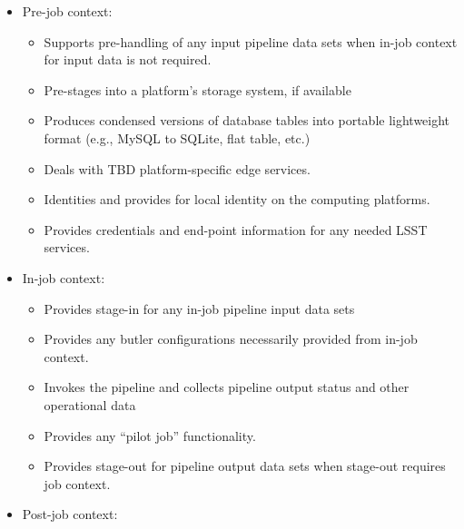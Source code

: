 \begin{itemize}

\item Pre-job context:

    \begin{itemize}

    \item Supports pre-handling of any input pipeline data sets when in-job
    context for input data is not required.

    \item Pre-stages into a platform’s storage system, if available

    \item Produces condensed versions of database tables into portable
    lightweight format (e.g., MySQL to SQLite, flat table, etc.)

    \item Deals with TBD platform-specific edge services.

    \item Identities and provides for local identity on the computing platforms.

    \item Provides  credentials and end-point information for any needed LSST
    services.

    \end{itemize}

\item In-job context:

    \begin{itemize}

    \item Provides stage-in for any in-job pipeline input data sets

    \item Provides any butler configurations necessarily provided from in-job
    context.

    \item Invokes the pipeline and collects pipeline output status and other
    operational data

    \item Provides any “pilot job” functionality.

    \item Provides stage-out for pipeline output data sets when stage-out
    requires job context.

    \end{itemize}

\item Post-job context:


\end{itemize}
